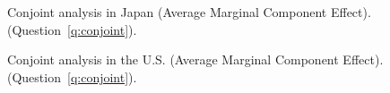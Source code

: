 \begin{figure}[h!]
    \caption[Conjoint analysis in Japan]{Conjoint analysis in Japan (Average Marginal Component Effect). \hfill (Question~\ref{q:conjoint}).
    }\label{fig:conjoint_JP}
\end{figure} 
\begin{figure}[h!]
    \caption[Conjoint analysis in the U.S.]{Conjoint analysis in the U.S. (Average Marginal Component Effect). \hfill (Question~\ref{q:conjoint}).
    }\label{fig:conjoint_US}
\end{figure} 


